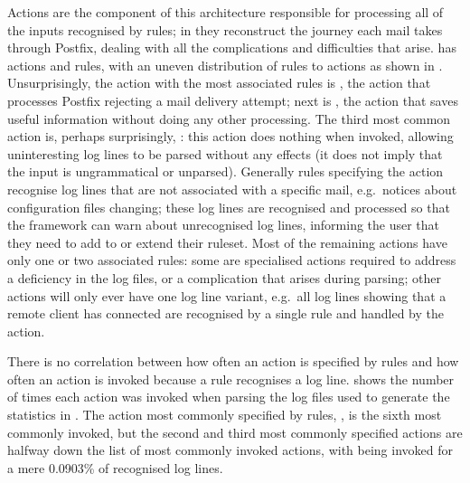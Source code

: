 Actions are the component of this architecture responsible for processing
all of the inputs recognised by rules; in \parsername{} they reconstruct
the journey each mail takes through Postfix, dealing with all the
complications and difficulties that arise.  \parsername{} has
\numberOFactions{} actions and \numberOFrules{} rules, with an uneven
distribution of rules to actions as shown in .  Unsurprisingly, the action with the most associated
rules is , the action that processes Postfix
rejecting a mail delivery attempt; next is , the action
that saves useful information without doing any other processing.  The
third most common action is, perhaps surprisingly, :
this action does nothing when invoked, allowing uninteresting log lines to
be parsed without any effects (it does not imply that the input is
ungrammatical or unparsed).  Generally rules specifying the
 action recognise log lines that are not associated
with a specific mail, e.g.\ notices about configuration files changing;
these log lines are recognised and processed so that the framework can warn
about unrecognised log lines, informing the user that they need to add to
or extend their ruleset.  Most of the remaining actions have only one or
two associated rules: some are specialised actions required to address a
deficiency in the log files, or a complication that arises during parsing;
other actions will only ever have one log line variant, e.g.\ all log lines
showing that a remote client has connected are recognised by a single rule
and handled by the  action.

There is no correlation between how often an action is specified by rules
and how often an action is invoked because a rule recognises a log line.
 shows the number of
times each action was invoked when parsing the \numberOFlogFILES{} log
files used to generate the statistics in .
The action most commonly specified by rules, ,
is the sixth most commonly invoked, but the second and third most commonly
specified actions are halfway down the list of most commonly invoked
actions, with  being invoked for a mere 0.0903\% of
recognised log lines.

